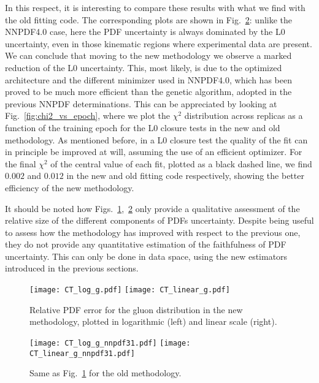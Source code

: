 In this respect, it is interesting to compare these results with what we find with the old fitting code. The corresponding
plots are shown in Fig.~\ref{fig:CT_uncertainty_g_nnpdf3.1}: unlike the NNPDF4.0 case, here the PDF uncertainty 
is always dominated by the L0 uncertainty, even in those kinematic regions where experimental data are present.
We can conclude that moving to the new methodology we observe a marked reduction of the L0 uncertainty.
This, most likely, is due to the optimized architecture and the different minimizer used in NNPDF4.0, 
which has been proved to be much more efficient than the genetic algorithm, adopted in the previous NNPDF determinations.
This can be appreciated by looking at Fig.~\ref{fig:chi2_vs_epoch},
where we plot the $\chi^2$ distribution across replicas as a function of the training epoch for the L0 closure tests
in the new and old methodology. As mentioned before, in a L0 closure test the quality of the fit can in principle be improved at will,
assuming the use of an efficient optimizer.
For the final $\chi^2$ of the central value of each fit, plotted as a black dashed line, 
we find $0.002$ and $0.012$ in the new and old fitting code respectively,
showing the better efficiency of the new methodology. 

It should be noted how Figs.~\ref{fig:CT_uncertainty_g},~\ref{fig:CT_uncertainty_g_nnpdf3.1} only provide a qualitative assessment of the relative size of the different
components of PDFs uncertainty. Despite being useful to assess how the methodology has improved with respect
to the previous one, they do not provide any quantitative estimation of the faithfulness of PDF uncertainty.
This can only be done in data space, using the new estimators introduced in the previous sections.

\begin{figure}[h]
    \centering
    \texttt{[image: CT\_log\_g.pdf]}
    \texttt{[image: CT\_linear\_g.pdf]}
    \caption{Relative PDF error for the gluon distribution in the new methodology,
    plotted in logarithmic (left) and linear scale (right).}
    \label{fig:CT_uncertainty_g}    
\end{figure}

\begin{figure}[h]
    \centering
    \texttt{[image: CT\_log\_g\_nnpdf31.pdf]}
    \texttt{[image: CT\_linear\_g\_nnpdf31.pdf]}
    \caption{Same as Fig.~\ref{fig:CT_uncertainty_g} for the old methodology.}
    \label{fig:CT_uncertainty_g_nnpdf3.1}    
\end{figure}

